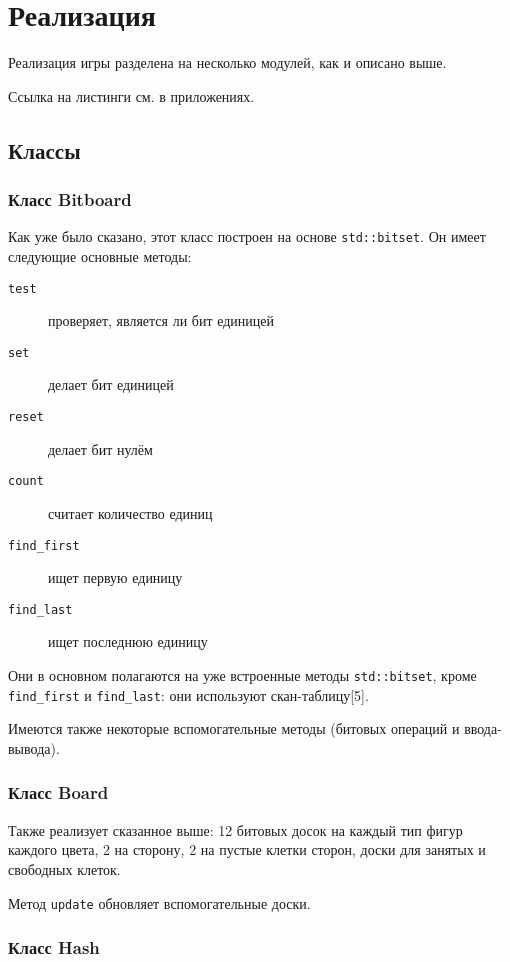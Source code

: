 \chapter{Реализация}

Реализация игры разделена на несколько модулей, как и описано выше. 

Ссылка на листинги см. в приложениях.

\section{Классы}

\subsection*{Класс Bitboard}

Как уже было сказано, этот класс построен на основе \texttt{std::bitset}. Он имеет следующие основные методы:
\begin{description}
	\item[\texttt{test}] проверяет, является ли бит единицей
	\item[\texttt{set}] делает бит единицей
	\item[\texttt{reset}] делает бит нулём
	\item[\texttt{count}] считает количество единиц
	\item[\texttt{find\_first}] ищет первую единицу
	\item[\texttt{find\_last}] ищет последнюю единицу
\end{description}

Они в основном полагаются на уже встроенные методы \texttt{std::bitset}, кроме \texttt{find\_first} и \texttt{find\_last}: они используют скан-таблицу[5].

Имеются также некоторые вспомогательные методы (битовых операций и ввода-вывода).

\subsection*{Класс Board}

Также реализует сказанное выше: 12 битовых досок на каждый тип фигур каждого цвета, 2 на сторону, 2 на пустые клетки сторон, доски для занятых и свободных клеток. 

Метод \texttt{update} обновляет вспомогательные доски.

\subsection*{Класс Hash}

